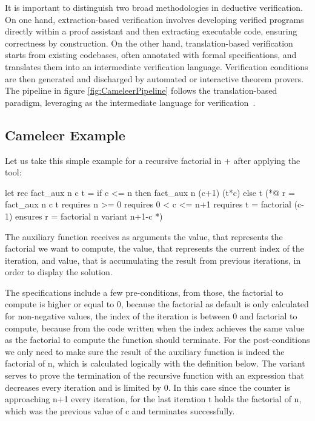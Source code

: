 It is important to distinguish two broad methodologies in deductive verification. On one hand, extraction-based verification involves 
developing verified programs directly within a proof assistant and then extracting executable code, ensuring correctness by construction. 
On the other hand, translation-based verification starts from existing codebases, often annotated with formal specifications, and translates 
them into an intermediate verification language. Verification conditions are then generated and discharged by automated or interactive 
theorem provers. The \cameleer pipeline in figure \ref{fig:CameleerPipeline} follows the translation-based paradigm, 
leveraging \whyml as the intermediate language for verification~\cite{Leroy09}.

\subsection{Cameleer Example}
\label{subsec:CameleerExample}

Let us take this simple example for a recursive factorial in \ocaml + \gospel after applying the \cameleer tool:

\begin{gospell}
let rec fact_aux n c t =
  if c <= n then fact_aux n (c+1) (t*c) else t
(*@
  r = fact_aux n c t
  requires n >= 0
  requires 0 < c <= n+1
  requires t = factorial (c-1)
  ensures r = factorial n
  variant n+1-c
*)
\end{gospell}

The auxiliary function  receives as arguments the  value, that represents the factorial we want to 
compute, the  value, that represents the current index of the iteration, and  value, that is accumulating 
the result from previous iterations, in order to display the solution.

The specifications include a few pre-conditions, from those, the factorial to compute is higher or equal to 0, because the factorial as 
default is only calculated for non-negative values, the index of the iteration is between 0 and factorial to compute, because from the
code written when the index achieves the same value as the factorial to compute the function should terminate. For the post-conditions
we only need to make sure the result of the auxiliary function is indeed the factorial of n, which is calculated logically with the 
definition below. The variant serves to prove the termination of the recursive function with an expression that decreases every iteration
and is limited by 0. In this case since the counter is approaching n+1 every iteration, for the last iteration t holds the factorial of n,
which was the previous value of c and terminates successfully.


